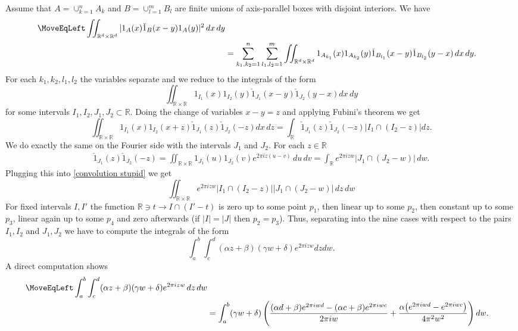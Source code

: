 \documentclass[12pt]{amsart}
\numberwithin{equation}{section}
\newcommand{\R}{\mathbb{R}}
\begin{document}
Assume that $A = \cup_{k=1}^n A_k$ and $B = \cup_{l=1}^m B_l$ are finite unions of axis-parallel boxes with disjoint interiors. We have
\begin{align*}
\MoveEqLeft\iint_{\R^d\times \R^d}|1_{A}(x) \check{1}_B(x-y) 1_A(y)|^2\,dx\, dy \\
&=\sum_{k_1,k_2=1}^n \sum_{l_1, l_2=1}^m \iint_{\R^d\times \R^d} 1_{A_{k_1}}(x) 1_{A_{k_2}}(y)\check{1}_{B_{l_1}}(x-y)\check{1}_{B_{l_2}}(y-x)\, dx\, dy.
\end{align*}
For each $k_1, k_2, l_1, l_2$ the variables separate and we reduce to the integrals of the form
$$\iint_{\R\times\R} 1_{I_1}(x)1_{I_2}(y)\check{1}_{J_1}(x-y)\check{1}_{J_2}(y-x) dx\, dy$$
for some intervals $I_1, I_2, J_1, J_2\subset \R$. Doing the change of variables $x-y = z$ and applying Fubini's theorem we get
\begin{equation}\label{convolution stupid}
\iint_{\R\times\R} 1_{I_1}(x)1_{I_2}(x+z)\check{1}_{J_1}(z)\check{1}_{J_2}(-z) dx\, dz = \int_{\R} \check{1}_{J_1}(z)\check{1}_{J_2}(-z) |I_1\cap (I_2-z)| dz.
\end{equation}
We do exactly the same on the Fourier side with the intervals $J_1$ and $J_2$. For each $z\in \R$
\begin{align*}
\check{1}_{J_1}(z)\check{1}_{J_2}(-z) = \iint_{\R\times \R} 1_{J_1}(u) 1_{J_2}(v) e^{2\pi i z(u-v)} \, du \, dv = \int_{\R} e^{2\pi i z w} |J_1 \cap (J_2 - w)| \, dw. 
\end{align*}
Plugging this into \eqref{convolution stupid} we get
\begin{equation}\label{feasible}
\iint_{\R\times\R} e^{2\pi i zw}|I_1\cap (I_2-z)||J_1\cap (J_2-w)| \,dz\, dw
\end{equation}
For fixed intervals $I, I'$ the function $\R \ni t\to I\cap (I'-t)$ is zero up to some point $p_1$, then linear up to some $p_2$, then constant up to some $p_3$, linear again up to some $p_4$ and zero afterwards (if $|I| = |J|$ then $p_2 = p_3$). Thus, separating into the nine cases with respect to the pairs $I_1, I_2$ and $J_1, J_2$ we have to compute the integrals of the form
$$\int_a^b\int_c^d (\alpha z+\beta)(\gamma w + \delta)e^{2\pi i zw}dzdw.$$
A direct computation shows 
\begin{align*}
\MoveEqLeft\int_a^b\int_c^d (\alpha z+\beta)(\gamma w + \delta)e^{2\pi i zw}\, dz\, dw\\
&= \int_a^b(\gamma w+\delta)\left(\frac{(\alpha d+\beta)e^{2\pi i w d}-(\alpha c+\beta)e^{2\pi i wc}}{2\pi i w}
+\frac{\alpha\big(e^{2\pi i wd}-e^{2\pi i wc}\big)}{4\pi^2 w^2}\right)dw.
\end{align*}%
\end{document}
